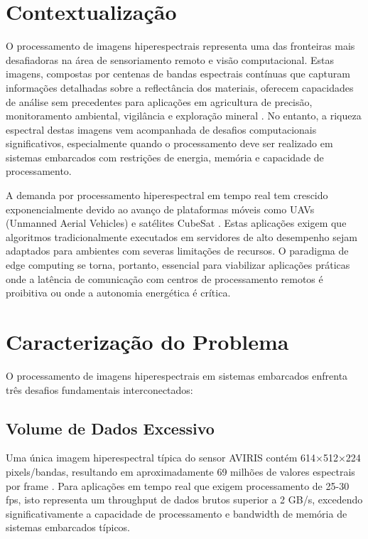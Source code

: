 
\section{Contextualização}

O processamento de imagens hiperespectrais representa uma das fronteiras mais desafiadoras na área de sensoriamento remoto e visão computacional. Estas imagens, compostas por centenas de bandas espectrais contínuas que capturam informações detalhadas sobre a reflectância dos materiais, oferecem capacidades de análise sem precedentes para aplicações em agricultura de precisão, monitoramento ambiental, vigilância e exploração mineral \cite{lou2024}. No entanto, a riqueza espectral destas imagens vem acompanhada de desafios computacionais significativos, especialmente quando o processamento deve ser realizado em sistemas embarcados com restrições de energia, memória e capacidade de processamento.

A demanda por processamento hiperespectral em tempo real tem crescido exponencialmente devido ao avanço de plataformas móveis como UAVs (Unmanned Aerial Vehicles) e satélites CubeSat \cite{uav_review_2024}. Estas aplicações exigem que algoritmos tradicionalmente executados em servidores de alto desempenho sejam adaptados para ambientes com severas limitações de recursos. O paradigma de edge computing se torna, portanto, essencial para viabilizar aplicações práticas onde a latência de comunicação com centros de processamento remotos é proibitiva ou onde a autonomia energética é crítica.

\section{Caracterização do Problema}

O processamento de imagens hiperespectrais em sistemas embarcados enfrenta três desafios fundamentais interconectados:

\subsection{Volume de Dados Excessivo}

Uma única imagem hiperespectral típica do sensor AVIRIS contém 614×512×224 pixels/bandas, resultando em aproximadamente 69 milhões de valores espectrais por frame \cite{aviris_2020}. Para aplicações em tempo real que exigem processamento de 25-30 fps, isto representa um throughput de dados brutos superior a 2 GB/s, excedendo significativamente a capacidade de processamento e bandwidth de memória de sistemas embarcados típicos.


